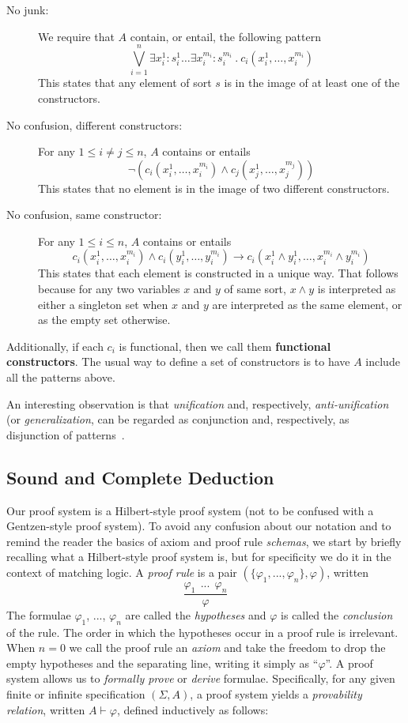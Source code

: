 \documentclass[UTF8,11pt]{article}
\theoremstyle{plain}
\theoremstyle{definition}
\theoremstyle{remark}
\newcommand{\ra}{\rightarrow}
\begin{document}
\begin{description}
\item[No junk:]
We require that $A$ contain, or entail, the following pattern
$$
\bigvee_{i=1}^n \exists x_i^1:s_i^1\dots\exists x_i^{m_i}:s_i^{m_i}\ .\
c_i(x_i^1,\dots,x_i^{m_i})
$$
This states that any element of sort $s$ is in the image of at least one of
the constructors.

\item[No confusion, different constructors:]
For any $1 \leq i \neq j \leq n$, $A$ contains or entails
$$
\neg(c_i(x_i^1,\dots,x_i^{m_i}) \wedge c_j(x_j^1,\dots,x_j^{m_j}))
$$
This states that no element is in the image of two different constructors.
\item[No confusion, same constructor:] For any $1\leq i\leq n$, $A$ contains
or entails
$$
c_i(x_i^1,\dots,x_i^{m_i}) \wedge
c_i(y_i^1,\dots,y_i^{m_i}) \ra
c_i(x_i^1 \wedge y_i^1,\dots,x_i^{m_i}\wedge y_i^{m_i})
$$
This states that each element is constructed in a unique way.
That follows because for any two variables $x$ and $y$ of same sort,
$x \wedge y$ is interpreted as either a singleton set when $x$ and $y$
are interpreted as the same element, or as the empty set otherwise.
\end{description}
Additionally, if each $c_i$ is functional, then we call them
\textbf{functional constructors}.
The usual way to define a set of constructors is to have $A$
include all the patterns above.

An interesting observation is that \emph{unification} and, respectively,
\emph{anti-unification} (or \emph{generalization},
can be regarded as conjunction and, respectively, as disjunction of
patterns~\cite{rosu-2017-lmcs}.

\subsection{Sound and Complete Deduction}
\label{sec:deduction}

\newcommand{\sequent}[2]{{#1}\vdash{#2}}

Our proof system is a Hilbert-style proof system (not to be confused with a
Gentzen-style proof system).
To avoid any confusion about our notation and to remind the reader the
basics of axiom and proof rule \emph{schemas}, we start by briefly recalling
what a Hilbert-style proof system is, but for specificity we do it in the
context of matching logic.
A \emph{proof rule} is a pair $(\{\varphi_1,...,\varphi_n\},\varphi)$,
written
$$
\frac{
\varphi_1 \ \ ... \ \ \varphi_n
}{\varphi}
$$
The formulae $\varphi_1$, ..., $\varphi_n$ are called the \emph{hypotheses}
and $\varphi$ is called the \emph{conclusion} of the rule.
The order in which the hypotheses occur in a proof rule is irrelevant.
When $n = 0$ we call the proof rule an \emph{axiom} and take the freedom to
drop the empty hypotheses and the separating line, writing it simply as
``$\varphi$''.
A proof system allows us to \emph{formally prove} or \emph{derive} formulae.
Specifically, for any given finite or infinite specification $(\Sigma,A)$,
a proof system yields a \emph{provability relation},
written $\sequent{A}{\varphi}$, defined inductively as follows:
\end{document}
